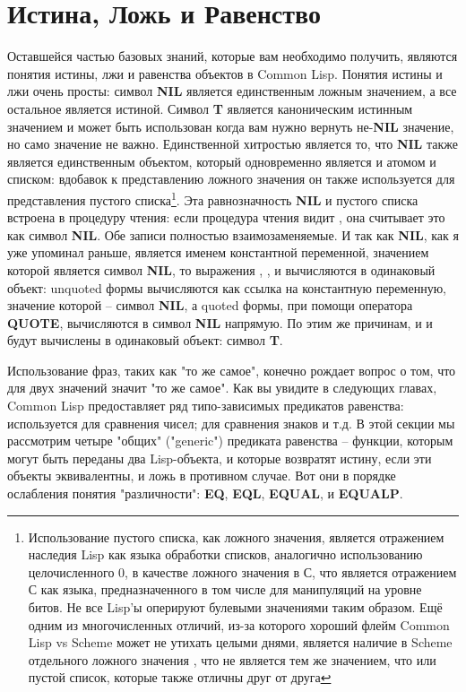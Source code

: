 \section{Истина, Ложь и Равенство}

Оставшейся частью базовых знаний, которые вам необходимо получить, являются понятия
истины, лжи и равенства объектов в Common Lisp. Понятия истины и лжи очень просты: символ
\textbf{NIL} является единственным ложным значением, а все остальное является
истиной. Символ \textbf{T} является каноническим истинным значением и может быть
использован когда вам нужно вернуть не-\textbf{NIL} значение, но само значение не
важно. Единственной хитростью является то, что \textbf{NIL} также является единственным
объектом, который одновременно является и атомом и списком: вдобавок к представлению
ложного значения он также используется для представления пустого
списка\footnote{Использование пустого списка, как ложного значения, является отражением
  наследия Lisp как языка обработки списков, аналогично использованию целочисленного 0, в
  качестве ложного значения в С, что является отражением С как языка, предназначенного в
  том числе для манипуляций на уровне битов. Не все Lisp'ы оперируют булевыми значениями
  таким образом. Ещё одним из многочисленных отличий, из-за которого хороший флейм Common
  Lisp vs Scheme может не утихать целыми днями, является наличие в Scheme отдельного
  ложного значения , что не является тем же значением, что  или пустой
  список, которые также отличны друг от друга}. Эта равнозначность \textbf{NIL} и пустого
списка встроена в процедуру чтения: если процедура чтения видит \code{()}, она считывает
это как символ \textbf{NIL}. Обе записи полностью взаимозаменяемые. И так как
\textbf{NIL}, как я уже упоминал раньше, является именем константной переменной, значением
которой является символ \textbf{NIL}, то выражения , \code{()},  и
 вычисляются в одинаковый объект: unquoted формы вычисляются как ссылка на
константную переменную, значение которой -- символ \textbf{NIL}, а quoted формы, при
помощи оператора \textbf{QUOTE}, вычисляются в символ \textbf{NIL} напрямую. По этим же
причинам, и  и  будут вычислены в одинаковый объект: символ \textbf{T}.

Использование фраз, таких как "то же самое", конечно рождает вопрос о том, что для двух
значений значит "то же самое". Как вы увидите в следующих главах, Common Lisp
предоставляет ряд типо-зависимых предикатов равенства: \code{=} используется для сравнения
чисел;  для сравнения знаков и т.д. В этой секции мы рассмотрим четыре "общих"
("generic") предиката равенства -- функции, которым могут быть переданы два Lisp-объекта,
и которые возвратят истину, если эти объекты эквивалентны, и ложь в противном случае. Вот
они в порядке ослабления понятия "различности": \textbf{EQ}, \textbf{EQL}, \textbf{EQUAL},
и \textbf{EQUALP}.

